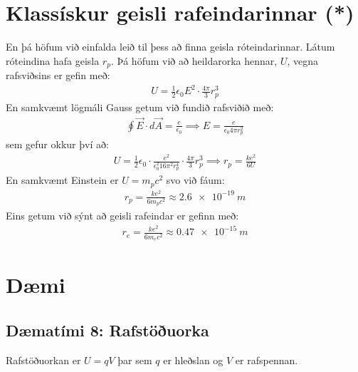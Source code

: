 \ifdefined \wholebook \else\documentclass[oneside]{book}\usepackage{EdlBook}\graphicspath{{figures/}}
\begin{document}
\section{Klassískur geisli rafeindarinnar (*)}

En þá höfum við einfalda leið til þess að finna geisla róteindarinnar. Látum róteindina hafa geisla $r_p$. Þá höfum við að heildarorka hennar, $U$, vegna rafsviðsins er gefin með:
\begin{align*}
    U = \frac{1}{2}\epsilon_0 E^2 \cdot \frac{4\pi}{3} r_p^3
\end{align*}
En samkvæmt lögmáli Gauss getum við fundið rafsviðið með:
\begin{align*}
    \oint \Vec{E} \cdot d\Vec{A} = \frac{e}{\epsilon_0} \implies E = \frac{e}{\epsilon_0 4\pi r_p^2}
\end{align*}
sem gefur okkur því að:
\begin{align*}
    U = \frac{1}{2} \epsilon_0 \cdot \frac{e^2}{\epsilon_0^2 16\pi^2 r_p^4} \cdot \frac{4\pi}{3} r_p^3 \implies r_p = \frac{ke^2}{6 U}
\end{align*}
En samkvæmt Einstein er $U = m_p c^2$ svo við fáum:
\begin{align*}
    r_p = \frac{ke^2}{6m_p c^2} \approx \SI{2.6e-19}{m}
\end{align*}
Eins getum við sýnt að geisli rafeindar er gefinn með:
\begin{align*}
    r_e = \frac{ke^2}{6 m_e c^2} \approx \SI{0.47e-15}{m}
\end{align*}

\newpage

\section{Dæmi}


\subsection*{Dæmatími 8: Rafstöðuorka}

\begin{tcolorbox}
Rafstöðuorkan er $U = qV$ þar sem $q$ er hleðslan og $V$ er rafspennan.
\end{tcolorbox}
\end{document}
